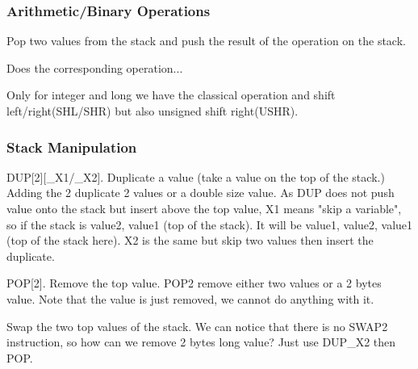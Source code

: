 \subsubsection{Arithmetic/Binary Operations}
Pop two values from the stack and push the result of the operation on the stack.
\theoremstyle{definition}
\begin{definition}
    Does the corresponding operation...
\end{definition}
\theoremstyle{definition}
\begin{definition}  
    Only for integer and long we have the classical operation and shift
    left/right(SHL/SHR) but also unsigned shift right(USHR).
\end{definition}
\subsubsection{Stack Manipulation}
\theoremstyle{definition}
\begin{definition}[DUP]
    DUP[2][\_X1/\_X2]. Duplicate a value (take a value on the top
    of the stack.) Adding the 2 duplicate 2 values or a double size value. As
    DUP does not push value onto the stack but insert above the top value, X1
    means "skip a variable", so if the stack is value2, value1 (top of the
    stack). It will be value1, value2, value1 (top of the stack here).
    X2 is the same but skip two values then insert the duplicate.
\end{definition}
\theoremstyle{definition}
\begin{definition}[POP]
    POP[2]. Remove the top value. POP2 remove either two values
    or a 2 bytes value. Note that the value is just removed, we cannot do
    anything with it.
\end{definition}
\theoremstyle{definition}
\begin{definition}[SWAP]
    Swap the two top values of the stack. We can notice that there is no SWAP2
    instruction, so how can we remove 2 bytes long value? Just use DUP\_X2 then
    POP.
\end{definition}
